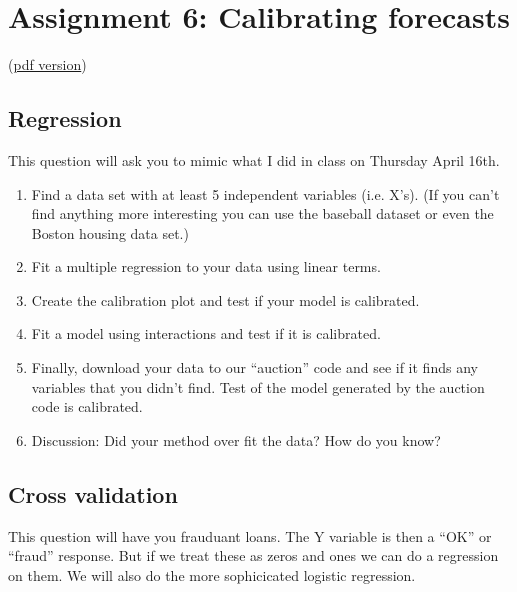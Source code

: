 \documentclass[12pt]{extarticle}
\begin{document}
\setcounter{section}{5}

\section{Assignment 6: Calibrating forecasts}

(\href{assignment6.pdf}{pdf version}) 

\subsection{Regression}
This question will ask you to mimic what I did in class on Thursday
April 16th.  
\begin{enumerate}
\item Find a data set with at least 5 independent variables
  (i.e. X's).  (If you can't find anything more interesting you can
  use the baseball dataset or even the Boston housing data set.)
\item Fit a multiple regression to your data using linear terms.
\item Create the calibration plot and test if your model is calibrated.
\item Fit a model using interactions and test if it is calibrated.
\item Finally, download your data to our ``auction'' code and see if
  it finds any variables that you didn't find.  Test of the model
  generated by the auction code is calibrated.
\item Discussion: Did your method over fit the data?  How do you know?
\end{enumerate}

\subsection{Cross validation}

This question will have you frauduant loans.  The Y variable is then a
 ``OK'' or ``fraud'' response.  But if we treat these as zeros and
 ones we can do a regression on them.  We will also do the more
 sophicicated logistic regression.
\end{document}
